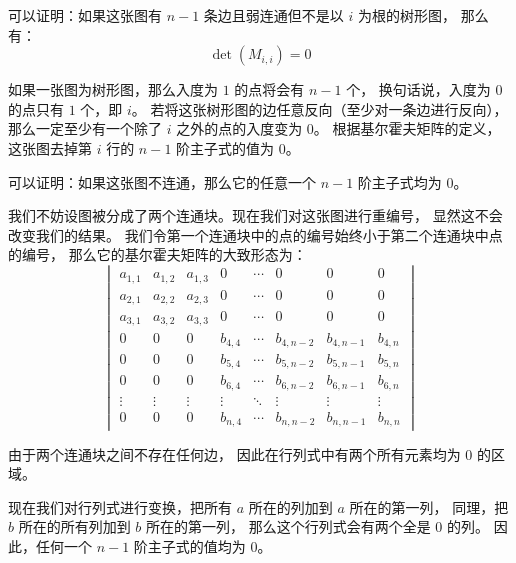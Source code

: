 \documentclass[UTF8]{article}
\begin{document}
	可以证明：如果这张图有 $n - 1$ 条边且弱连通但不是以 $i$ 为根的树形图，
	那么有：
	$$
	\det(M_{i, i}) = 0
	$$

	\bigskip


	如果一张图为树形图，那么入度为 $1$ 的点将会有 $n - 1$ 个，
	换句话说，入度为 $0$ 的点只有 $1$ 个，即 $i$。
	若将这张树形图的边任意反向（至少对一条边进行反向），
	那么一定至少有一个除了 $i$ 之外的点的入度变为 $0$。
	根据基尔霍夫矩阵的定义，
	这张图去掉第 $i$ 行的 $n - 1$ 阶主子式的值为 $0$。

	\bigskip


	可以证明：如果这张图不连通，那么它的任意一个 $n - 1$ 阶主子式均为 $0$。

	\bigskip


	我们不妨设图被分成了两个连通块。现在我们对这张图进行重编号，
	显然这不会改变我们的结果。
	我们令第一个连通块中的点的编号始终小于第二个连通块中点的编号，
	那么它的基尔霍夫矩阵的大致形态为：
	\begin{equation*}
		\begin{vmatrix}
			a_{1, 1} & a_{1, 2} & a_{1, 3} & 0 & \cdots & 0 & 0 & 0
			\\
			a_{2, 1} & a_{2, 2} & a_{2, 3} & 0 & \cdots & 0 & 0 & 0
			\\
			a_{3, 1} & a_{3, 2} & a_{3, 3} & 0 & \cdots & 0 & 0 & 0
			\\
			0 & 0 & 0 & b_{4, 4} & \cdots & b_{4, n - 2} & b_{4, n - 1} & b_{4, n}
			\\
			0 & 0 & 0 & b_{5, 4} & \cdots & b_{5, n - 2} & b_{5, n - 1} & b_{5, n}
			\\
			0 & 0 & 0 & b_{6, 4} & \cdots & b_{6, n - 2} & b_{6, n - 1} & b_{6, n}
			\\
			\vdots & \vdots & \vdots & \vdots & \ddots &  \vdots & \vdots & \vdots
			\\
			0 & 0 & 0 & b_{n, 4} & \cdots & b_{n, n - 2} & b_{n, n - 1} & b_{n, n}
		\end{vmatrix}
	\end{equation*}

	由于两个连通块之间不存在任何边，
	因此在行列式中有两个所有元素均为 $0$ 的区域。

	现在我们对行列式进行变换，把所有 $a$ 所在的列加到 $a$ 所在的第一列，
	同理，把 $b$ 所在的所有列加到 $b$ 所在的第一列，
	那么这个行列式会有两个全是 $0$ 的列。
	因此，任何一个 $n - 1$ 阶主子式的值均为 $0$。
\end{document}
